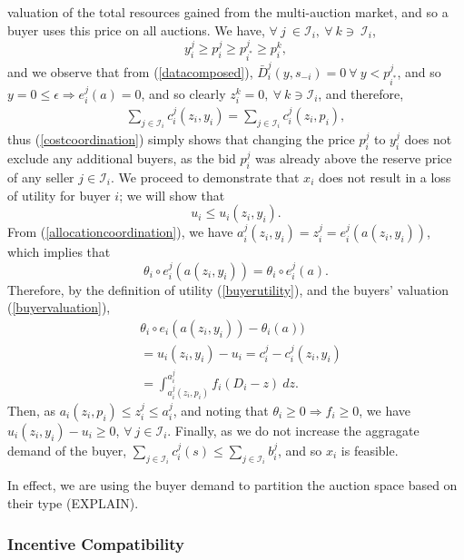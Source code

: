 \documentclass[12pt]{article}
\theoremstyle{definition}
\newcommand{\mcI}{\mathcal{I}}
\begin{document}
\begin{multicols}{2}
valuation of the total resources gained from the multi-auction market, and so a buyer uses this price on all
auctions.
We have, $\forall \ j\  \in \mcI_i, \ \forall \ k \ni \ \mcI_i$,
$$
    y_i^j \ge p_i^j \ge p_{i^*}^j\ge p_i^k,
$$
and we observe that from (\ref{datacomposed}), $\bar{D}_i^j(y, s_{-i}) =
0 \ \forall \ y < p_{i^*}^j$, and so $y=0 \le \epsilon \Rightarrow e_i^j(a) = 0$,
and so clearly $z_i^k = 0, \ \forall \ k \ni \mcI_i$, and therefore,
\begin{align*}
    \displaystyle\sum_{j\in\mcI_i} c_i^j(z_i,y_i) =\sum_{j\in\mcI_i}
c_i^j(z_i,p_i),
\end{align*}
thus (\ref{costcoordination}) simply shows that changing the price $p^j_i$ to $y^j_i$ does not exclude any
additional buyers, as the bid $p^j_i$ was already above the reserve price of any
seller $j \in \mcI_i$.
We proceed to demonstrate that $x_i$ does not result in a loss of utility for
buyer $i$; we will show that
$$
    u_i \le u_i(z_i,y_i).
$$
From (\ref{allocationcoordination}), we have $a_i^{j}(z_i,y_i) = z_i^{j} = e_i^j(a(z_i,y_i))$, which
implies that 
$$
\theta_i\circ e_i^j(a(z_i,y_i)) = \theta_i\circ e_i^j(a).
$$ 
Therefore, by the definition of utility (\ref{buyerutility}),
and the buyers' valuation (\ref{buyervaluation}), 
\begin{align*}
    &\theta_i\circ e_i(a(z_i,y_i)) - \theta_i(a)) \\
    &= u_i(z_i,y_i) - u_i =  c_i^j -c_i^{j}(z_i,y_i)\\
    &= \displaystyle\int_{a_i^j(z_i,p_i)}^{a_i^j} f_i(D_i - z) \ dz.
\end{align*}
Then, as $a_i(z_i,p_i) \le z_i^j \le a_i^j $, and noting that
$\theta_i\ge 0\Rightarrow f_i\ge 0$, we have $u_i(z_i,y_i) - u_i \ge 0$, $\forall \ j\in\mcI_i$.
Finally, as we do
not increase the aggragate demand of the buyer, $\sum_{j\in\mcI_i} c_i^j(s) \le 
\sum_{j\in\mcI_i} b_i^j$, and so $x_i$ is feasible.

In effect, we are using the buyer demand
to partition the auction space based on their type (EXPLAIN). \\

\subsubsection{Incentive Compatibility}


\end{multicols}
\end{document}
